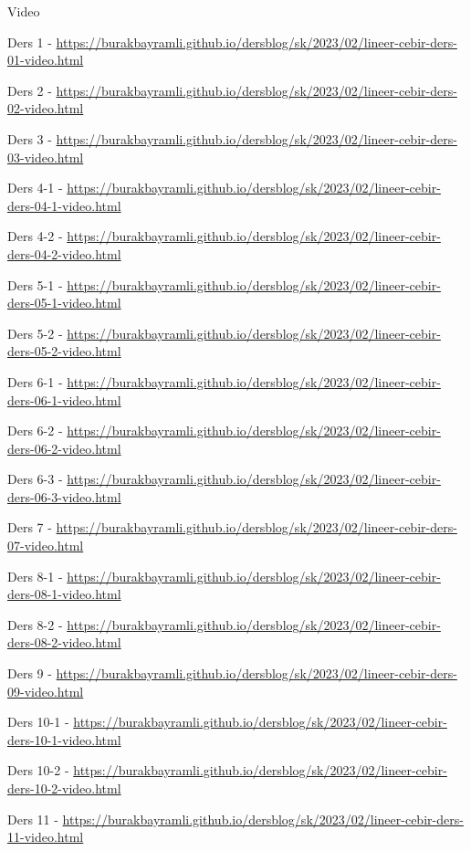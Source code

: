 \documentclass[12pt,fleqn]{article}\usepackage{../../common}
\begin{document}
Video

Ders 1 - \url{https://burakbayramli.github.io/dersblog/sk/2023/02/lineer-cebir-ders-01-video.html}

Ders 2 - \url{https://burakbayramli.github.io/dersblog/sk/2023/02/lineer-cebir-ders-02-video.html}

Ders 3 - \url{https://burakbayramli.github.io/dersblog/sk/2023/02/lineer-cebir-ders-03-video.html}

Ders 4-1 - \url{https://burakbayramli.github.io/dersblog/sk/2023/02/lineer-cebir-ders-04-1-video.html}

Ders 4-2 - \url{https://burakbayramli.github.io/dersblog/sk/2023/02/lineer-cebir-ders-04-2-video.html}

Ders 5-1 - \url{https://burakbayramli.github.io/dersblog/sk/2023/02/lineer-cebir-ders-05-1-video.html}

Ders 5-2 - \url{https://burakbayramli.github.io/dersblog/sk/2023/02/lineer-cebir-ders-05-2-video.html}

Ders 6-1 - \url{https://burakbayramli.github.io/dersblog/sk/2023/02/lineer-cebir-ders-06-1-video.html}

Ders 6-2 - \url{https://burakbayramli.github.io/dersblog/sk/2023/02/lineer-cebir-ders-06-2-video.html}

Ders 6-3 - \url{https://burakbayramli.github.io/dersblog/sk/2023/02/lineer-cebir-ders-06-3-video.html}

Ders 7 - \url{https://burakbayramli.github.io/dersblog/sk/2023/02/lineer-cebir-ders-07-video.html}

Ders 8-1 - \url{https://burakbayramli.github.io/dersblog/sk/2023/02/lineer-cebir-ders-08-1-video.html}

Ders 8-2 - \url{https://burakbayramli.github.io/dersblog/sk/2023/02/lineer-cebir-ders-08-2-video.html}

Ders 9 - \url{https://burakbayramli.github.io/dersblog/sk/2023/02/lineer-cebir-ders-09-video.html}

Ders 10-1 - \url{https://burakbayramli.github.io/dersblog/sk/2023/02/lineer-cebir-ders-10-1-video.html}

Ders 10-2 - \url{https://burakbayramli.github.io/dersblog/sk/2023/02/lineer-cebir-ders-10-2-video.html}

Ders 11 - \url{https://burakbayramli.github.io/dersblog/sk/2023/02/lineer-cebir-ders-11-video.html}
\end{document}

